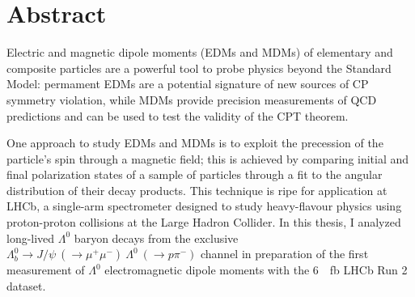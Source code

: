 \documentclass[12pt,a4paper]{book}
\renewcommand{\chaptermark}[1]{\markboth{#1}{}}
\newcommand{\demonstratorfull}{$\Lambda_b^0 \rightarrow J/\psi~(\rightarrow \mu^+ \mu^-)~\Lambda^0~(\rightarrow p\pi^-)$\xspace}
\newcommand{\lz}{$\Lambda^0$\xspace}
\begin{document}





\mainmatter

\chapter*{Abstract}

Electric and magnetic dipole moments (EDMs and MDMs) of elementary and composite particles are a powerful tool to probe physics beyond the Standard Model:
permament EDMs are a potential signature of new sources of CP symmetry violation, while MDMs provide precision measurements of QCD predictions and can be used to test the validity of the CPT theorem.

One approach to study EDMs and MDMs is to exploit the precession of the particle's spin %
through a magnetic field;
this is achieved by comparing initial and final polarization states of a sample of particles through a fit to the angular distribution of their decay products.
This technique is ripe for application at LHCb, a single-arm spectrometer designed to study heavy-flavour physics using proton-proton collisions at the Large Hadron Collider.
In this thesis, I analyzed long-lived \lz baryon decays from the exclusive \demonstratorfull channel in preparation of the first measurement of \lz electromagnetic dipole moments with the \SI{6}{\per\femto\barn} LHCb Run 2 dataset.
\end{document}
